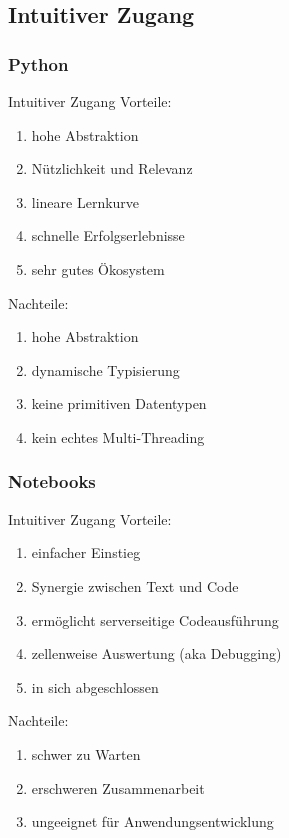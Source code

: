 \documentclass[german,aspectratio=169]{beamer}
\begin{document}
\subsection{Intuitiver Zugang}

\begin{frame}
	\frametitle{Python}
	\begin{block}{Intuitiver Zugang}
		Vorteile:
		\begin{enumerate}[label = $\bullet$]
			\item hohe Abstraktion
			\item Nützlichkeit und Relevanz
			\item lineare Lernkurve
			\item schnelle Erfolgserlebnisse
			\item sehr gutes Ökosystem
		\end{enumerate}
		Nachteile:
		\begin{enumerate}[label = $\bullet$]
			\item hohe Abstraktion
			\item dynamische Typisierung
			\item keine primitiven Datentypen
			\item kein echtes Multi-Threading
		\end{enumerate}
	\end{block}
\end{frame}

\begin{frame}
	\frametitle{Notebooks}
	\begin{block}{Intuitiver Zugang}
		Vorteile:
		\begin{enumerate}[label = $\bullet$]
			\item einfacher Einstieg
			\item Synergie zwischen Text und Code
			\item ermöglicht serverseitige Codeausführung
			\item zellenweise Auswertung (aka Debugging)
			\item in sich abgeschlossen 
		\end{enumerate}
		Nachteile:
		\begin{enumerate}[label = $\bullet$]
			\item schwer zu Warten
			\item erschweren Zusammenarbeit
			\item ungeeignet für Anwendungsentwicklung
		\end{enumerate}
	\end{block}
\end{frame}
\end{document}
